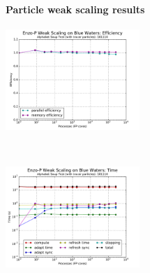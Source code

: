 \begin{frame}[fragile,label=ss-recent-particles] 
  \secframetitle{\ssRecentParticles}
  \framesubtitle{Particle weak scaling results}
\begin{center}
  \vspace{-0.1in}
  \begin{minipage}{4.50in}
    \begin{center}
      \begin{minipage}{2in}
    \includegraphics[width=2.0in]{scaling-efficiency-161110.pdf}
    \end{minipage} \ 
      \begin{minipage}{2in}
    \includegraphics[width=2.0in]{scaling-time-161110.pdf}
    \end{minipage} \\
    \end{center}
  \end{minipage} \\
\end{center}
  
\end{frame}
